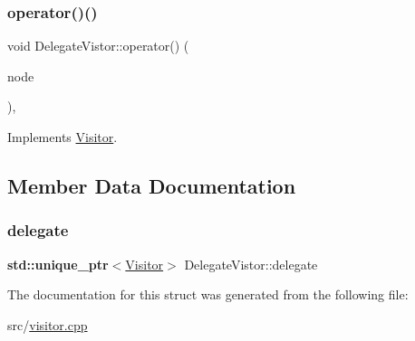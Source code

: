 \subsubsection{\texorpdfstring{operator()()}{operator()()}\hspace{0.1cm}{\footnotesize\ttfamily [60/60]}}
{\footnotesize\ttfamily void Delegate\+Vistor\+::operator() (\begin{DoxyParamCaption}\item[{const \hyperlink{struct_program_declaration}{Program\+Declaration} \&}]{node }\end{DoxyParamCaption})\hspace{0.3cm}{\ttfamily [inline]}, {\ttfamily [virtual]}}



Implements \hyperlink{struct_visitor_ab6afd14c23c1fa6f01d24e2593ac91bf}{Visitor}.



\subsection{Member Data Documentation}
\mbox{\label{struct_delegate_vistor_a44c9e8b830bb102fde7b6203ce9bfdbf}} 
\subsubsection{\texorpdfstring{delegate}{delegate}}
{\footnotesize\ttfamily \textbf{ std\+::unique\+\_\+ptr}$<$\hyperlink{struct_visitor}{Visitor}$>$ Delegate\+Vistor\+::delegate}



The documentation for this struct was generated from the following file\+:\begin{DoxyCompactItemize}
\item 
src/\hyperlink{visitor_8cpp}{visitor.\+cpp}\end{DoxyCompactItemize}
